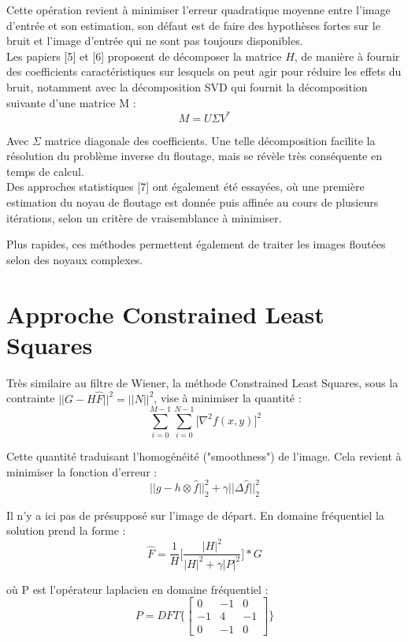 \documentclass{article}
\begin{document}
	Cette opération revient à minimiser l'erreur quadratique moyenne entre l'image d'entrée et son estimation, son défaut est de faire des hypothèses fortes sur le bruit et l'image d'entrée qui ne sont pas toujours disponibles.
	\\
	
	Les papiers [5] et [6] proposent de décomposer la matrice $H$, de manière à fournir des coefficients caractéristiques sur lesquels on peut agir pour réduire les effets du bruit, notamment avec la décomposition SVD qui fournit la décomposition suivante d'une matrice M :
	$$ M = U \Sigma V^*$$
	
	Avec $\Sigma$ matrice diagonale des coefficients. Une telle décomposition facilite la résolution du problème inverse du floutage, mais se révèle très conséquente en temps de calcul.
	\\
	
	Des approches statistiques [7] ont également été essayées, où une première estimation du noyau de floutage est donnée puis affinée au cours de plusieurs itérations, selon un critère de vraisemblance à minimiser.
	
	Plus rapides, ces méthodes permettent également de traiter les images floutées selon des noyaux complexes.
	\newpage
	
	
\section{Approche Constrained Least Squares}

	Très similaire au filtre de Wiener, la méthode Constrained Least Squares, sous la contrainte $||G - H \hat{F}||^2 = ||N||^2$, vise à minimiser la quantité :
	$$\sum\limits_{i=0}^{M-1} \sum\limits_{i=0}^{N-1} \big[\nabla ^2 f(x,y)]^2 $$
	
	Cette quantité traduisant l'homogénéité ("smoothness") de l'image. Cela revient à minimiser la fonction d'erreur :
	$$||g - h \otimes \hat{f}||^2 _2 + \gamma ||\Delta \hat{f}||^2 _2$$
	
	Il n'y a ici pas de présupposé sur l'image de départ.
	En domaine fréquentiel la solution prend la forme :
	$$\hat F = \frac {1}{H} \bigg[ \frac {|H|^2}{|H|^2 + \gamma |P|^2 } \bigg] * G$$ 
	
	où P est l'opérateur laplacien en domaine fréquentiel : 
	$$ P = DFT\bigg\{\begin{bmatrix}
		0 & -1 & 0 \\
		-1 & 4 & -1 \\
		0 & -1 & 0 
		\end{bmatrix}\bigg\}$$
		
\end{document}
